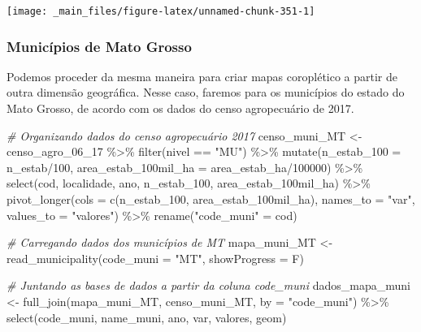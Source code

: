 \documentclass[
  brazilian,
]{book}
\newenvironment{Shaded}{\begin{snugshade}}{\end{snugshade}}
\newcommand{\AttributeTok}[1]{\textcolor[rgb]{0.77,0.63,0.00}{#1}}
\newcommand{\CommentTok}[1]{\textcolor[rgb]{0.56,0.35,0.01}{\textit{#1}}}
\newcommand{\DecValTok}[1]{\textcolor[rgb]{0.00,0.00,0.81}{#1}}
\newcommand{\FunctionTok}[1]{\textcolor[rgb]{0.00,0.00,0.00}{#1}}
\newcommand{\NormalTok}[1]{#1}
\newcommand{\OtherTok}[1]{\textcolor[rgb]{0.56,0.35,0.01}{#1}}
\newcommand{\SpecialCharTok}[1]{\textcolor[rgb]{0.00,0.00,0.00}{#1}}
\newcommand{\StringTok}[1]{\textcolor[rgb]{0.31,0.60,0.02}{#1}}
\begin{document}
\begin{center}\texttt{[image: \_main\_files/figure-latex/unnamed-chunk-351-1]} \end{center}

\hypertarget{municuxedpios-de-mato-grosso}{%
\subsubsection*{Municípios de Mato Grosso}\label{municuxedpios-de-mato-grosso}}

Podemos proceder da mesma maneira para criar mapas coroplético a partir de outra dimensão geográfica. Nesse caso, faremos para os municípios do estado do Mato Grosso, de acordo com os dados do censo agropecuário de 2017.

\begin{Shaded}
\begin{Highlighting}[]
\CommentTok{\# Organizando dados do censo agropecuário 2017}
\NormalTok{censo\_muni\_MT }\OtherTok{\textless{}{-}}\NormalTok{ censo\_agro\_06\_17 }\SpecialCharTok{\%\textgreater{}\%} 
  \FunctionTok{filter}\NormalTok{(nivel }\SpecialCharTok{==} \StringTok{"MU"}\NormalTok{) }\SpecialCharTok{\%\textgreater{}\%} 
  \FunctionTok{mutate}\NormalTok{(}\AttributeTok{n\_estab\_100 =}\NormalTok{ n\_estab}\SpecialCharTok{/}\DecValTok{100}\NormalTok{,}
         \AttributeTok{area\_estab\_100mil\_ha =}\NormalTok{ area\_estab\_ha}\SpecialCharTok{/}\DecValTok{100000}\NormalTok{) }\SpecialCharTok{\%\textgreater{}\%} 
  \FunctionTok{select}\NormalTok{(cod, localidade, ano, n\_estab\_100, area\_estab\_100mil\_ha) }\SpecialCharTok{\%\textgreater{}\%}  
  \FunctionTok{pivot\_longer}\NormalTok{(}\AttributeTok{cols =} \FunctionTok{c}\NormalTok{(n\_estab\_100, area\_estab\_100mil\_ha),}
               \AttributeTok{names\_to =} \StringTok{"var"}\NormalTok{,}
               \AttributeTok{values\_to =} \StringTok{"valores"}\NormalTok{) }\SpecialCharTok{\%\textgreater{}\%} 
  \FunctionTok{rename}\NormalTok{(}\StringTok{"code\_muni"} \OtherTok{=}\NormalTok{ cod)}

\CommentTok{\# Carregando dados dos municípios de MT}
\NormalTok{mapa\_muni\_MT }\OtherTok{\textless{}{-}} \FunctionTok{read\_municipality}\NormalTok{(}\AttributeTok{code\_muni =} \StringTok{"MT"}\NormalTok{, }\AttributeTok{showProgress =}\NormalTok{ F)}

\CommentTok{\# Juntando as bases de dados a partir da coluna \textasciigrave{}code\_muni\textasciigrave{}}
\NormalTok{dados\_mapa\_muni }\OtherTok{\textless{}{-}} \FunctionTok{full\_join}\NormalTok{(mapa\_muni\_MT, censo\_muni\_MT, }\AttributeTok{by =} \StringTok{"code\_muni"}\NormalTok{) }\SpecialCharTok{\%\textgreater{}\%} 
  \FunctionTok{select}\NormalTok{(code\_muni, name\_muni, ano, var, valores, geom)}
\end{Highlighting}
\end{Shaded}
\end{document}
